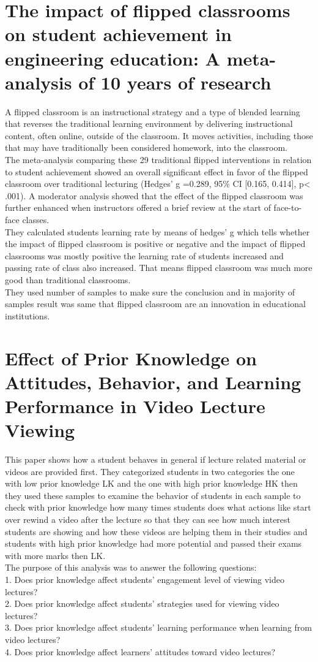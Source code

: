 \documentclass[12pt]{article}
\begin{document}
\section{The impact of flipped classrooms on student achievement in engineering education: A meta-analysis of 10 years of research}
A flipped classroom is an instructional strategy and a type of blended learning that reverses the traditional learning environment by delivering instructional content, often online, outside of the classroom. It moves activities, including those that may have traditionally been considered homework, into the classroom.\\
The meta-analysis comparing these 29 traditional flipped interventions in relation to student achievement showed an overall significant effect in favor of the flipped classroom over traditional lecturing (Hedges' g =0.289, 95\% CI [0.165, 0.414], p< .001). A moderator analysis showed that the effect of the flipped classroom was further enhanced when instructors offered a brief review at the start of face-to-face classes.\\
They calculated students learning rate by means of hedges' g which tells whether the impact of flipped classroom is positive or negative and the impact of flipped classrooms was mostly positive the learning rate of students increased and passing rate of class also increased. That means flipped classroom was much more good than traditional classrooms.\\
They used number of samples to make sure the conclusion and in majority of samples result was same that flipped classroom are an innovation in educational institutions.


\section{Effect of Prior Knowledge on Attitudes, Behavior, and Learning Performance in Video Lecture Viewing}
This paper shows how a student behaves in general if lecture related material or videos are provided first. They categorized students in two categories the one with low prior knowledge LK and the one with high prior knowledge HK then they used these samples to examine the behavior of students in each sample to check with prior knowledge how many times students does what actions like start over rewind a video after the lecture so that they can see how much interest students are showing and how these videos are helping them in their studies and students with high prior knowledge had more potential and passed their exams with more marks then LK.\\
The purpose of this analysis was to answer the following questions:\\
1. Does prior knowledge affect students’ engagement level of viewing video lectures?\\
2. Does prior knowledge affect students’ strategies used for viewing video lectures?\\
3. Does prior knowledge affect students’ learning performance when learning from video lectures?\\
4. Does prior knowledge affect learners’ attitudes toward video lectures?\\
\end{document}
